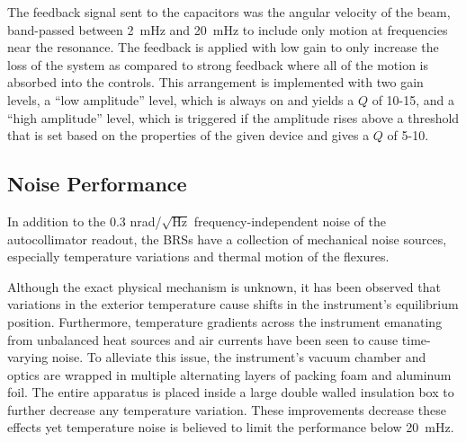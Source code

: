 \documentclass [12pt, proquest]{uwthesis}[2019]
\begin{document}
The feedback signal sent to the capacitors was the angular velocity of the beam, band-passed between 2~mHz and 20~mHz to include only motion at frequencies near the resonance. The feedback is applied with low gain to only increase the loss of the system as compared to strong feedback where all of the motion is absorbed into the controls. This arrangement is implemented with two gain levels, a ``low amplitude'' level, which is always on and yields a $Q$ of 10-15, and a ``high amplitude'' level, which is triggered if the amplitude rises above a threshold that is set based on the properties of the given device and gives a $Q$ of 5-10.

\subsection{Noise Performance}\label{BRSNoise}

In addition to the 0.3 nrad/$\sqrt{\text{Hz}}$ frequency-independent noise of the autocollimator readout, the BRSs have a collection of mechanical noise sources, especially temperature variations and thermal motion of the flexures.

Although the exact physical mechanism is unknown, it has been observed that variations in the exterior temperature cause shifts in the instrument's equilibrium position. Furthermore, temperature gradients across the instrument emanating from unbalanced heat sources and air currents have been seen to cause time-varying noise. To alleviate this issue, the instrument's vacuum chamber and optics are wrapped in multiple alternating layers of packing foam and aluminum foil. The entire apparatus is placed inside a large double walled insulation box to further decrease any temperature variation. These improvements decrease these effects yet temperature noise is believed to limit the performance below 20~mHz.
\end{document}
